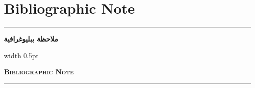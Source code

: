 \documentclass[10pt,a4paper]{book}
\newlength{\colwidth}
\newcommand{\bilingualsectionheader}[2]{%
  \par\vspace{0.8em}
  \noindent
  \begin{minipage}[t]{\colwidth}
  \begin{flushright}
  \textbf{\arabicfont #1}
  \end{flushright}
  \end{minipage}%
  \hfill\textcolor{columnsepclr}{\vrule width 0.5pt}\hfill
  \begin{minipage}[t]{\colwidth}
  \textbf{\textsc{#2}}
  \end{minipage}%
  \par\vspace{0.5em}
}
\begin{document}
\chapter*{Bibliographic Note}

\noindent\textcolor{columnsepclr}{\rule{\textwidth}{0.6pt}}\par\vspace{0.3em}
\bilingualsectionheader{ملاحظة ببليوغرافية}{Bibliographic Note}
\noindent\textcolor{columnsepclr}{\rule{\textwidth}{0.6pt}}\par\vspace{0.5em}
\end{document}
